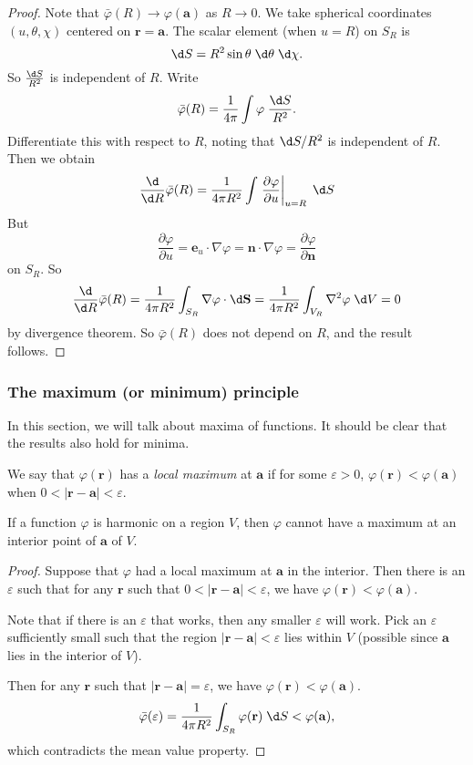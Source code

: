 \documentclass[a4paper]{article}
\begin{document}
\begin{proof}
  Note that $\bar\varphi (R) \to \varphi(\mathbf{a})$ as $R \to 0$. We take spherical coordinates $(u, \theta, \chi)$ centered on $\mathbf{r} = \mathbf{a}$. The scalar element (when $u = R$) on $S_R$ is
  \[
    \d S = R^2 \sin \theta\;\d \theta\;\d \chi.
  \]
  So $\frac{\d S}{R^2}$ is independent of $R$. Write
  \[
    \bar\varphi(R) = \frac{1}{4\pi}\int \varphi \;\frac{\d S}{R^2}.
  \]
  Differentiate this with respect to $R$, noting that $\d S/R^2$ is independent of $R$. Then we obtain
  \[
    \frac{\d}{\d R}\bar\varphi(R) = \frac{1}{4\pi R^2}\int \left.\frac{\partial \varphi}{\partial u}\right|_{u = R}\;\d S
  \]
  But
  \[
    \frac{\partial\varphi}{\partial u} = \mathbf{e}_u \cdot \nabla \varphi = \mathbf{n}\cdot \nabla \varphi = \frac{\partial\varphi}{\partial \mathbf{n}}
  \]
  on $S_R$. So
  \[
    \frac{\d}{\d R}\bar\varphi(R) = \frac{1}{4\pi R^2}\int_{S_R} \nabla \varphi \cdot \d \mathbf{S} = \frac{1}{4\pi R^2}\int_{V_R}\nabla^2 \varphi \;\d V = 0
  \]
  by divergence theorem. So $\bar \varphi(R)$ does not depend on $R$, and the result follows.
\end{proof}
\subsubsection{The maximum (or minimum) principle}
In this section, we will talk about maxima of functions. It should be clear that the results also hold for minima.

\begin{defi}
  We say that $\varphi(\mathbf{r})$ has a \emph{local maximum} at $\mathbf{a}$ if for some $\varepsilon > 0$, $\varphi(\mathbf{r}) < \varphi(\mathbf{a})$ when $0 < |\mathbf{r} - \mathbf{a}| < \varepsilon$.
\end{defi}

\begin{prop}
  If a function $\varphi$ is harmonic on a region $V$, then $\varphi$ cannot have a maximum at an interior point of $\mathbf{a}$ of $V$.
\end{prop}

\begin{proof}
  Suppose that $\varphi$ had a local maximum at $\mathbf{a}$ in the interior. Then there is an $\varepsilon$ such that for any $\mathbf{r}$ such that $0 < |\mathbf{r} - \mathbf{a}| < \varepsilon$, we have $\varphi(\mathbf{r}) < \varphi (\mathbf{a})$.

  Note that if there is an $\varepsilon$ that works, then any smaller $\varepsilon$ will work. Pick an $\varepsilon$ sufficiently small such that the region $|\mathbf{r} - \mathbf{a}| < \varepsilon$ lies within $V$ (possible since $\mathbf{a}$ lies in the interior of $V$).

  Then for any $\mathbf{r}$ such that $|\mathbf{r} - \mathbf{a}| = \varepsilon$, we have $\varphi(\mathbf{r}) < \varphi(\mathbf{a})$.
  \[
    \bar\varphi (\varepsilon) = \frac{1}{4\pi R^2}\int_{S_R}\varphi(\mathbf{r})\;\d S < \varphi(\mathbf{a}),
  \]
  which contradicts the mean value property.
\end{proof}
\end{document}
